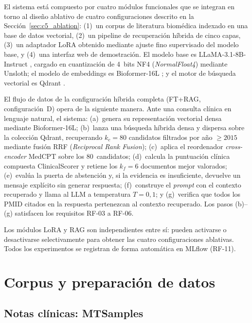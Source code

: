 \documentclass[11pt,a4paper,spanish]{book}
\numberwithin{equation}{chapter}
\numberwithin{figure}{chapter}
\begin{document}
El sistema está compuesto por cuatro módulos funcionales que se integran en torno al diseño ablativo de cuatro configuraciones descrito en la Sección~\ref{sec:c5_ablation}: (1)~un corpus de literatura biomédica indexado en una base de datos vectorial, (2)~un pipeline de recuperación híbrida de cinco capas, (3)~un adaptador LoRA obtenido mediante ajuste fino supervisado del modelo base, y (4)~una interfaz web de demostración. El modelo base es LLaMA-3.1-8B-Instruct \cite{grattafiori2024llama3herdmodels}, cargado en cuantización de 4~bits NF4 (\textit{NormalFloat4}) mediante Unsloth; el modelo de embeddings es Bioformer-16L \cite{fang2023bioformerefficienttransformerlanguage}; y el motor de búsqueda vectorial es Qdrant \cite{malkov_efficient_2020}.

El flujo de datos de la configuración híbrida completa (FT+RAG, configuración~D) opera de la siguiente manera. Ante una consulta clínica en lenguaje natural, el sistema: (a)~genera su representación vectorial densa mediante Bioformer-16L; (b)~lanza una búsqueda híbrida densa y dispersa sobre la colección Qdrant, recuperando $k_c = 80$ candidatos filtrados por año $\geq 2015$ mediante fusión RRF (\textit{Reciprocal Rank Fusion}); (c)~aplica el reordenador \textit{cross-encoder} MedCPT \cite{jin2023medcpt} sobre los 80~candidatos; (d)~calcula la puntuación clínica compuesta ClinicalScorer y retiene los $k_f = 6$ documentos mejor valorados; (e)~evalúa la puerta de abstención y, si la evidencia es insuficiente, devuelve un mensaje explícito sin generar respuesta; (f)~construye el \textit{prompt} con el contexto recuperado y llama al LLM a temperatura $T = 0{,}1$; y (g)~verifica que todos los PMID citados en la respuesta pertenezcan al contexto recuperado. Los pasos (b)--(g) satisfacen los requisitos RF-03 a RF-06.

Los módulos LoRA y RAG son independientes entre sí: pueden activarse o desactivarse selectivamente para obtener las cuatro configuraciones ablativas. Todos los experimentos se registran de forma automática en MLflow \cite{Zaharia_Accelerating_the_Machine_2018} (RF-11).

\section{Corpus y preparación de datos}
\label{sec:c5_corpus}

\subsection{Notas clínicas: MTSamples}
\label{sec:c5_mtsamples}
\end{document}
